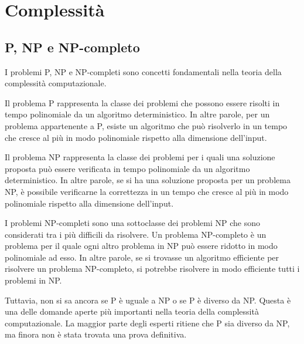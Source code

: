 
\chapter{Complessit\`a}

\section{P, NP e NP-completo}
I problemi P, NP e NP-completi sono concetti fondamentali nella teoria della complessità computazionale. 

Il problema P rappresenta la classe dei problemi che possono essere risolti in tempo polinomiale da un algoritmo deterministico. In altre parole, per un problema appartenente a P, esiste un algoritmo che può risolverlo in un tempo che cresce al più in modo polinomiale rispetto alla dimensione dell'input.

Il problema NP rappresenta la classe dei problemi per i quali una soluzione proposta può essere verificata in tempo polinomiale da un algoritmo deterministico. In altre parole, se si ha una soluzione proposta per un problema NP, è possibile verificarne la correttezza in un tempo che cresce al più in modo polinomiale rispetto alla dimensione dell'input.

I problemi NP-completi sono una sottoclasse dei problemi NP che sono considerati tra i più difficili da risolvere. Un problema NP-completo è un problema per il quale ogni altro problema in NP può essere ridotto in modo polinomiale ad esso. In altre parole, se si trovasse un algoritmo efficiente per risolvere un problema NP-completo, si potrebbe risolvere in modo efficiente tutti i problemi in NP.

Tuttavia, non si sa ancora se P è uguale a NP o se P è diverso da NP. Questa è una delle domande aperte più importanti nella teoria della complessità computazionale. La maggior parte degli esperti ritiene che P sia diverso da NP, ma finora non è stata trovata una prova definitiva.
